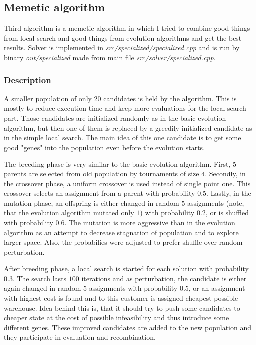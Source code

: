 \documentclass[./main.tex]{subfiles}
\begin{document}
\subsection{Memetic algorithm}
Third algorithm is a memetic algorithm in which I tried to combine good things from local search and good things from evolution algorithms and get the best results.
Solver is implemented in \textit{src/specialized/specialized.cpp} and is run by binary \textit{out/specialized} made from main file \textit{src/solver/specialized.cpp}.

\subsubsection{Description}

A smaller population of only $20$ candidates is held by the algorithm.
This is mostly to reduce execution time and keep more evaluations for the local search part.
Those candidates are initialized randomly as in the basic evolution algorithm, but then one of them is replaced by a greedily initialized candidate as in the simple local search.
The main idea of this one candidate is to get some good "genes" into the population even before the evolution starts.

The breeding phase is very similar to the basic evolution algorithm.
First, $5$ parents are selected from old population by tournaments of size $4$.
Secondly, in the crossover phase, a uniform crossover is used instead of single point one.
This crossover selects an assignment from a parent with probability $0.5$.
Lastly, in the mutation phase, an offspring is either changed in random $5$ assignments (note, that the evolution algorithm mutated only $1$) with probability $0.2$, or is shuffled with probability $0.6$.
The mutation is more aggressive than in the evolution algorithm as an attempt to decrease stagnation of population and to explore larger space.
Also, the probabilies were adjusted to prefer shuffle over random perturbation.

After breeding phase, a local search is started for each solution with probability $0.3$.
The search lasts $100$ iterations and as perturbation, the candidate is either again changed in random $5$ assignments with probability $0.5$, or an assignment with highest cost is found and to this customer is assigned cheapest possible warehouse.
Idea behind this is, that it should try to push some candidates to cheaper state at the cost of possible infeasibility and thus introduce some different genes.
These improved candidates are added to the new population and they participate in evaluation and recombination.
\end{document}
